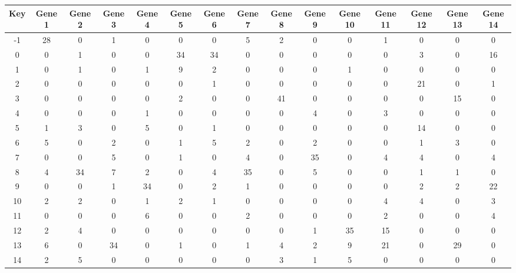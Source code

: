 \begin{tabular}{|c|c|c|c|c|c|c|c|c|c|c|c|c|c|c|}
\hline
Key & Gene 1 & Gene 2 & Gene 3 & Gene 4 & Gene 5 & Gene 6 & Gene 7 & Gene 8 & Gene 9 & Gene 10 & Gene 11 & Gene 12 & Gene 13 & Gene 14 \\
\hline
-1 & 28 & 0 & 1 & 0 & 0 & 0 & 5 & 2 & 0 & 0 & 1 & 0 & 0 & 0 \\
0 & 0 & 1 & 0 & 0 & 34 & 34 & 0 & 0 & 0 & 0 & 0 & 3 & 0 & 16 \\
1 & 0 & 1 & 0 & 1 & 9 & 2 & 0 & 0 & 0 & 1 & 0 & 0 & 0 & 0 \\
2 & 0 & 0 & 0 & 0 & 0 & 1 & 0 & 0 & 0 & 0 & 0 & 21 & 0 & 1 \\
3 & 0 & 0 & 0 & 0 & 2 & 0 & 0 & 41 & 0 & 0 & 0 & 0 & 15 & 0 \\
4 & 0 & 0 & 0 & 1 & 0 & 0 & 0 & 0 & 4 & 0 & 3 & 0 & 0 & 0 \\
5 & 1 & 3 & 0 & 5 & 0 & 1 & 0 & 0 & 0 & 0 & 0 & 14 & 0 & 0 \\
6 & 5 & 0 & 2 & 0 & 1 & 5 & 2 & 0 & 2 & 0 & 0 & 1 & 3 & 0 \\
7 & 0 & 0 & 5 & 0 & 1 & 0 & 4 & 0 & 35 & 0 & 4 & 4 & 0 & 4 \\
8 & 4 & 34 & 7 & 2 & 0 & 4 & 35 & 0 & 5 & 0 & 0 & 1 & 1 & 0 \\
9 & 0 & 0 & 1 & 34 & 0 & 2 & 1 & 0 & 0 & 0 & 0 & 2 & 2 & 22 \\
10 & 2 & 2 & 0 & 1 & 2 & 1 & 0 & 0 & 0 & 0 & 4 & 4 & 0 & 3 \\
11 & 0 & 0 & 0 & 6 & 0 & 0 & 2 & 0 & 0 & 0 & 2 & 0 & 0 & 4 \\
12 & 2 & 4 & 0 & 0 & 0 & 0 & 0 & 0 & 1 & 35 & 15 & 0 & 0 & 0 \\
13 & 6 & 0 & 34 & 0 & 1 & 0 & 1 & 4 & 2 & 9 & 21 & 0 & 29 & 0 \\
14 & 2 & 5 & 0 & 0 & 0 & 0 & 0 & 3 & 1 & 5 & 0 & 0 & 0 & 0 \\
\hline
\end{tabular}